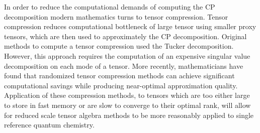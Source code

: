 	In order to reduce the computational demands of computing the CP decomposition modern mathematics turns to tensor compression.  Tensor compression reduces computational bottleneck of large tensor using smaller proxy tensors, which are then used to approximately the CP decomposition. Original methods to compute a tensor compression used the Tucker decomposition\cite{Bro1998,Lathauwer2000}. However, this approach requires the computation of an expensive singular value decomposition on each mode of a tensor. More recently, mathematicians have found that randomized tensor compression methods can achieve significant computational savings while producing near-optimal approximation quality\cite{Erichson2017}. Application of these compression methods, to tensors which are too either large to store in fast memory or are slow to converge to their optimal rank, will allow for reduced scale tensor algebra methods to be more reasonably applied to single reference quantum chemistry.
